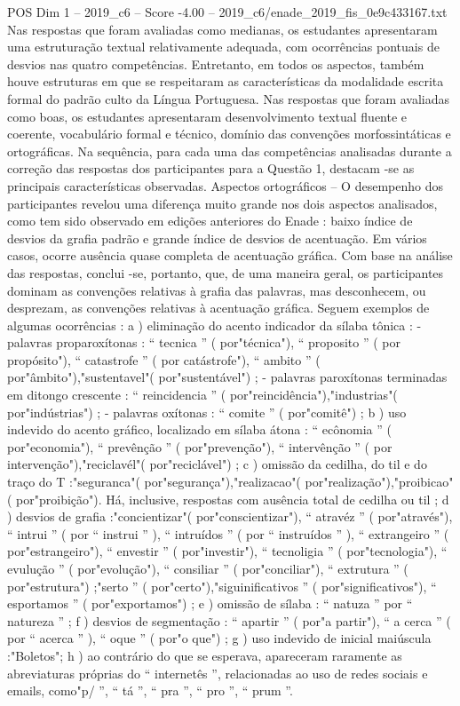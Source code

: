 \begin{textsample}{POS Dim 1 – 2019\_c6 – Score -4.00 – 2019\_c6/enade\_2019\_fis\_0e9c433167.txt}
Nas respostas que foram avaliadas como medianas, os estudantes apresentaram uma estruturação textual relativamente adequada, com ocorrências pontuais de desvios nas quatro competências.
Entretanto, em todos os aspectos, também houve estruturas em que se respeitaram as características da modalidade escrita formal do padrão culto da Língua Portuguesa.
Nas respostas que foram avaliadas como boas, os estudantes apresentaram desenvolvimento textual fluente e coerente, vocabulário formal e técnico, domínio das convenções morfossintáticas e ortográficas.
Na sequência, para cada uma das competências analisadas durante a correção das respostas dos participantes para a Questão 1, destacam -se as principais características observadas.
Aspectos ortográficos – O desempenho dos participantes revelou uma diferença muito grande nos dois aspectos analisados, como tem sido observado em edições anteriores do Enade : baixo índice de desvios da grafia padrão e grande índice de desvios de acentuação.
Em vários casos, ocorre ausência quase completa de acentuação gráfica.
Com base na análise das respostas, conclui -se, portanto, que, de uma maneira geral, os participantes dominam as convenções relativas à grafia das palavras, mas desconhecem, ou desprezam, as convenções relativas à acentuação gráfica.
Seguem exemplos de algumas ocorrências : a ) eliminação do acento indicador da sílaba tônica : - palavras proparoxítonas : “ tecnica ” ( por"técnica"), “ proposito ” ( por propósito"), “ catastrofe ” ( por catástrofe"), “ ambito ” ( por"âmbito"),"sustentavel"( por"sustentável") ; - palavras paroxítonas terminadas em ditongo crescente : “ reincidencia ” ( por"reincidência"),"industrias"( por"indústrias") ; - palavras oxítonas : “ comite ” ( por"comitê") ; b ) uso indevido do acento gráfico, localizado em sílaba átona : “ ecônomia ” ( por"economia"), “ prevênção ” ( por"prevenção"), “ intervênção ” ( por intervenção"),"reciclavél"( por"reciclável") ; c ) omissão da cedilha, do til e do traço do T :"seguranca"( por"segurança"),"realizacao"( por"realização"),"proibicao"( por"proibição").
Há, inclusive, respostas com ausência total de cedilha ou til ; d ) desvios de grafia :"concientizar"( por"conscientizar"), “ atravéz ” ( por"através"), “ intrui ” ( por “ instrui ” ), “ intruídos ” ( por “ instruídos ” ), “ extrangeiro ” ( por"estrangeiro"), “ envestir ” ( por"investir"), “ tecnoligia ” ( por"tecnologia"), “ evulução ” ( por"evolução"), “ consiliar ” ( por"conciliar"), “ extrutura ” ( por"estrutura") ;"serto ” ( por"certo"),"siguinificativos ” ( por"significativos"), “ esportamos ” ( por"exportamos") ; e ) omissão de sílaba : “ natuza ” por “ natureza ” ; f ) desvios de segmentação : “ apartir ” ( por"a partir"), “ a cerca ” ( por “ acerca ” ), “ oque ” ( por"o que") ; g ) uso indevido de inicial maiúscula :"Boletos"; h ) ao contrário do que se esperava, apareceram raramente as abreviaturas próprias do “ internetês ”, relacionadas ao uso de redes sociais e emails, como"p/ ”, “ tá ”, “ pra ”, “ pro ”, “ prum ”.

\end{textsample}
